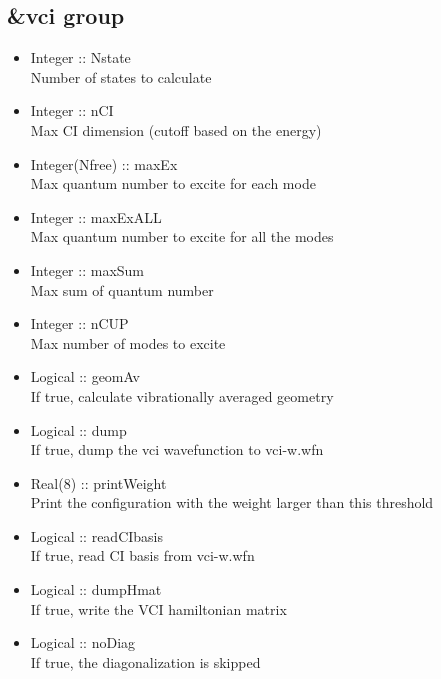 \documentclass[a4paper,12pt]{article}
\begin{document}
\subsection{\&vci group}
   \begin{itemize}
     \item Integer :: Nstate \\
       Number of states to calculate
     \item Integer :: nCI \\
       Max CI dimension (cutoff based on the energy)
     \item Integer(Nfree) :: maxEx \\
       Max quantum number to excite for each mode
     \item Integer :: maxExALL \\
       Max quantum number to excite for all the modes
     \item Integer :: maxSum \\
       Max sum of quantum number
     \item Integer :: nCUP \\
       Max number of modes to excite
     \item Logical :: geomAv \\
       If true, calculate vibrationally averaged geometry
     \item Logical :: dump \\
       If true, dump the vci wavefunction to vci-w.wfn
     \item Real(8) :: printWeight \\
       Print the configuration with the weight larger than this threshold
     \item Logical :: readCIbasis \\
       If true, read CI basis from vci-w.wfn
     \item Logical :: dumpHmat \\
       If true, write the VCI hamiltonian matrix
     \item Logical :: noDiag \\
       If true, the diagonalization is skipped
   \end{itemize}
   
\end{document}
